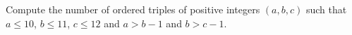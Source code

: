 Compute the number of ordered triples of positive integers $(a, b, c)$ such that $a \le 10$, $b \le 11$, $c \le 12$ and $a > b - 1$ and $b > c - 1$.
